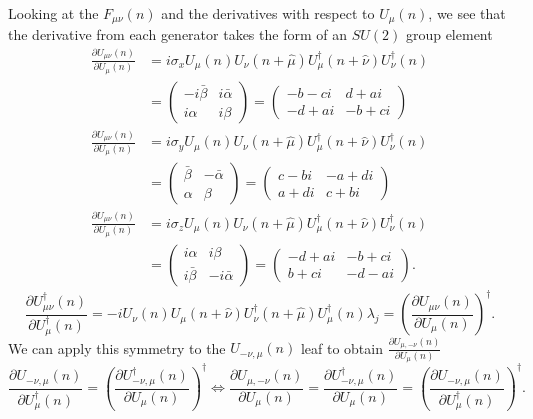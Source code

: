 	Looking at the $F_{\mu\nu}(n)$ and the derivatives with respect to $U_\mu(n)$, we see that the derivative from each
	generator takes the form of an $SU(2)$ group element
	\begin{align}
		\frac{\partial U_{\mu\nu}(n)}{\partial U_\mu(n)}&=
		i\sigma_x U_\mu(n)U_\nu\left(n+\hat{\mu}\right)U^\dagger_\mu\left(n+\hat{\nu}\right)U^\dagger_\nu(n)\nonumber\\
		&=\begin{pmatrix} -i\bar{\beta} & i\bar{\alpha} \\i\alpha & i\beta\end{pmatrix}=
		\begin{pmatrix} -b-ci & d+ai \\ -d+ai & -b+ci\end{pmatrix}\label{Eq:Sig_x_deriv}\\
		\frac{\partial U_{\mu\nu}(n)}{\partial U_\mu(n)}&=
		i\sigma_y U_\mu(n)U_\nu\left(n+\hat{\mu}\right)U^\dagger_\mu\left(n+\hat{\nu}\right)U^\dagger_\nu(n)\nonumber\\
		&=\begin{pmatrix} \bar{\beta} & -\bar{\alpha} \\\alpha & \beta\end{pmatrix}=
		\begin{pmatrix} c-bi & -a+di \\ a+di & c+bi\end{pmatrix}\label{Eq:Sig_y_deriv}\\
		\frac{\partial U_{\mu\nu}(n)}{\partial U_\mu(n)}&=
		i\sigma_z U_\mu(n)U_\nu\left(n+\hat{\mu}\right)U^\dagger_\mu\left(n+\hat{\nu}\right)U^\dagger_\nu(n)\nonumber\\
		&=\begin{pmatrix} i\alpha & i\beta \\i\bar{\beta} & -i\bar{\alpha}\end{pmatrix}=
		\begin{pmatrix} -d+ai & -b+ci \\ b+ci & -d-ai\end{pmatrix}\label{Eq:Sig_z_deriv}\text{.}
	\end{align}
	\begin{equation}\label{Eq:Site_Leaf_Conj Deriv}
		\frac{\partial U^\dagger_{\mu\nu}(n)}{\partial U^\dagger_\mu(n)}=
		-i U_\nu(n)U_\mu\left(n+\hat{\nu}\right)U^\dagger_\nu\left(n+\hat{\mu}\right)U^\dagger_\mu(n)\lambda_j=
		\left(\frac{\partial U_{\mu\nu}(n)}{\partial U_\mu(n)}\right)^\dagger\text{.}
	\end{equation}
	We can apply this symmetry to the $U_{-\nu,\mu}(n)$ leaf to obtain $\frac{\partial U_{\mu,-\nu}(n)}{\partial U_\mu(n)}$
	\begin{equation}\label{Eq:Deriv_Symm}
		\frac{\partial U_{-\nu,\mu}(n)}{\partial U^\dagger_\mu(n)}=
		\left(\frac{\partial U^\dagger_{-\nu,\mu}(n)}{\partial U_\mu(n)}\right)^\dagger\Leftrightarrow
		\frac{\partial U_{\mu,-\nu}(n)}{\partial U_\mu(n)}=
		\frac{\partial U^\dagger_{-\nu,\mu}(n)}{\partial U_\mu(n)}=
		\left(\frac{\partial U_{-\nu,\mu}(n)}{\partial U^\dagger_\mu(n)}\right)^\dagger\text{.}
	\end{equation}

